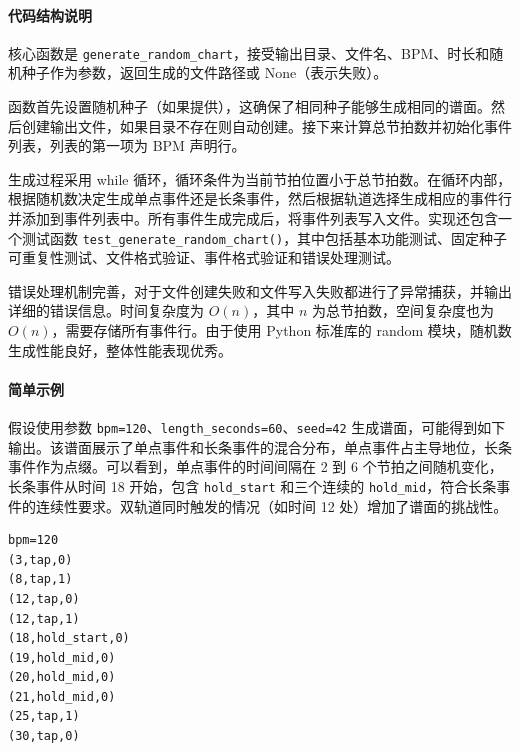 \documentclass[12pt, a4paper]{article}
\begin{document}
\paragraph{代码结构说明}
核心函数是 \texttt{generate\_random\_chart}，接受输出目录、文件名、BPM、时长和随机种子作为参数，返回生成的文件路径或 None（表示失败）。

函数首先设置随机种子（如果提供），这确保了相同种子能够生成相同的谱面。然后创建输出文件，如果目录不存在则自动创建。接下来计算总节拍数并初始化事件列表，列表的第一项为 BPM 声明行。

生成过程采用 while 循环，循环条件为当前节拍位置小于总节拍数。在循环内部，根据随机数决定生成单点事件还是长条事件，然后根据轨道选择生成相应的事件行并添加到事件列表中。所有事件生成完成后，将事件列表写入文件。实现还包含一个测试函数 \texttt{test\_generate\_random\_chart()}，其中包括基本功能测试、固定种子可重复性测试、文件格式验证、事件格式验证和错误处理测试。

错误处理机制完善，对于文件创建失败和文件写入失败都进行了异常捕获，并输出详细的错误信息。时间复杂度为 $O(n)$，其中 $n$ 为总节拍数，空间复杂度也为 $O(n)$，需要存储所有事件行。由于使用 Python 标准库的 random 模块，随机数生成性能良好，整体性能表现优秀。

\paragraph{简单示例}
假设使用参数 \texttt{bpm=120}、\texttt{length\_seconds=60}、\texttt{seed=42} 生成谱面，可能得到如下输出。该谱面展示了单点事件和长条事件的混合分布，单点事件占主导地位，长条事件作为点缀。可以看到，单点事件的时间间隔在 2 到 6 个节拍之间随机变化，长条事件从时间 18 开始，包含 \texttt{hold\_start} 和三个连续的 \texttt{hold\_mid}，符合长条事件的连续性要求。双轨道同时触发的情况（如时间 12 处）增加了谱面的挑战性。

\begin{verbatim}
bpm=120
(3,tap,0)
(8,tap,1)
(12,tap,0)
(12,tap,1)
(18,hold_start,0)
(19,hold_mid,0)
(20,hold_mid,0)
(21,hold_mid,0)
(25,tap,1)
(30,tap,0)
\end{verbatim}
\end{document}
